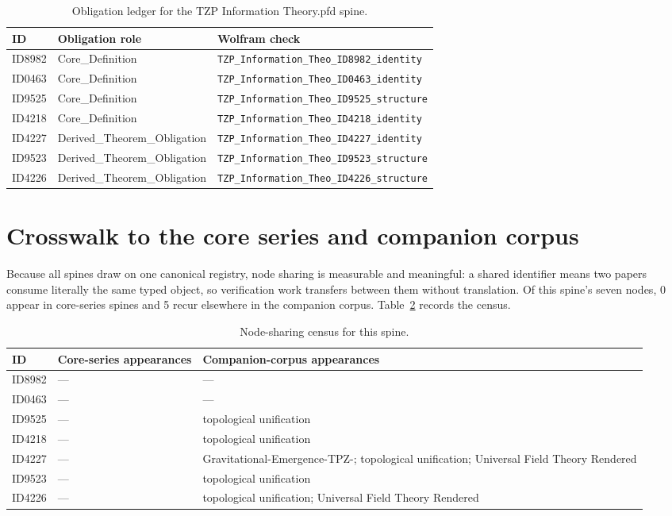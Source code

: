 \documentclass[11pt]{article}
\theoremstyle{remark}
\begin{document}
\begin{table}[ht]
\centering
\small
\caption{Obligation ledger for the TZP Information Theory.pfd spine.}
\label{tab:obligations}
\begin{tabular}{llp{6.2cm}}
\toprule
ID & Obligation role & Wolfram check \\
\midrule
ID8982 & Core\_Definition & \texttt{TZP\_Information\_Theo\_ID8982\_identity} \\
ID0463 & Core\_Definition & \texttt{TZP\_Information\_Theo\_ID0463\_identity} \\
ID9525 & Core\_Definition & \texttt{TZP\_Information\_Theo\_ID9525\_structure} \\
ID4218 & Core\_Definition & \texttt{TZP\_Information\_Theo\_ID4218\_identity} \\
ID4227 & Derived\_Theorem\_Obligation & \texttt{TZP\_Information\_Theo\_ID4227\_identity} \\
ID9523 & Derived\_Theorem\_Obligation & \texttt{TZP\_Information\_Theo\_ID9523\_structure} \\
ID4226 & Derived\_Theorem\_Obligation & \texttt{TZP\_Information\_Theo\_ID4226\_structure} \\
\bottomrule
\end{tabular}
\end{table}

\section{Crosswalk to the core series and companion corpus}
\label{sec:crosswalk}

Because all spines draw on one canonical registry, node sharing is measurable and meaningful: a shared identifier means two papers consume literally the same typed object, so verification work transfers between them without translation. Of this spine's seven nodes, 0 appear in core-series spines and 5 recur elsewhere in the companion corpus. Table~\ref{tab:crosswalk} records the census.

\begin{table}[ht]
\centering
\small
\caption{Node-sharing census for this spine.}
\label{tab:crosswalk}
\begin{tabular}{lp{4.4cm}p{6.6cm}}
\toprule
ID & Core-series appearances & Companion-corpus appearances \\
\midrule
ID8982 & --- & --- \\
ID0463 & --- & --- \\
ID9525 & --- & topological unification \\
ID4218 & --- & topological unification \\
ID4227 & --- & Gravitational-Emergence-TPZ-; topological unification; Universal Field Theory Rendered \\
ID9523 & --- & topological unification \\
ID4226 & --- & topological unification; Universal Field Theory Rendered \\
\bottomrule
\end{tabular}
\end{table}
\end{document}
